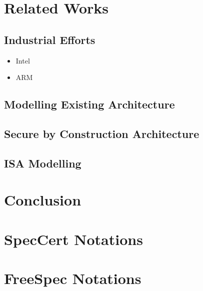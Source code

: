 \documentclass[
11pt, %
english, %
singlespacing, %
headsepline, %
]{MastersDoctoralThesis} %
\begin{document}
\chapter{Related Works}

\section{Industrial Efforts}

\begin{itemize}
\item Intel
\item ARM
\end{itemize}

\section{Modelling Existing Architecture}

\section{Secure by Construction Architecture}

\section{ISA Modelling}





\chapter{Conclusion}


\appendix %


\chapter{SpecCert Notations}

\chapter{FreeSpec Notations}

%
%
%


\printbibliography[heading=bibintoc]

\end{document}
